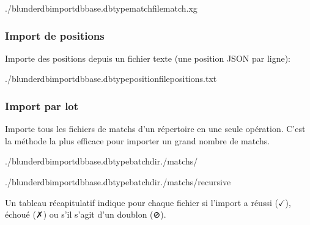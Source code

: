 \documentclass[letterpaper,10pt,french]{sphinxmanual}
\begin{document}
\begin{sphinxVerbatim}[commandchars=\\\{\}]
./blunderdbimport\PYGZhy{}\PYGZhy{}dbbase.db\PYGZhy{}\PYGZhy{}typematch\PYGZhy{}\PYGZhy{}filematch.xg
\end{sphinxVerbatim}


\subsubsection{Import de positions}
\label{\detokenize{cli:import-de-positions}}
\sphinxAtStartPar
Importe des positions depuis un fichier texte (une position JSON par ligne):

\begin{sphinxVerbatim}[commandchars=\\\{\}]
./blunderdbimport\PYGZhy{}\PYGZhy{}dbbase.db\PYGZhy{}\PYGZhy{}typeposition\PYGZhy{}\PYGZhy{}filepositions.txt
\end{sphinxVerbatim}


\subsubsection{Import par lot}
\label{\detokenize{cli:import-par-lot}}
\sphinxAtStartPar
Importe tous les fichiers de matchs d’un répertoire en une seule opération.
C’est la méthode la plus efficace pour importer un grand nombre de matchs.

\begin{sphinxVerbatim}[commandchars=\\\{\}]
./blunderdbimport\PYGZhy{}\PYGZhy{}dbbase.db\PYGZhy{}\PYGZhy{}typebatch\PYGZhy{}\PYGZhy{}dir./matchs/

./blunderdbimport\PYGZhy{}\PYGZhy{}dbbase.db\PYGZhy{}\PYGZhy{}typebatch\PYGZhy{}\PYGZhy{}dir./matchs/\PYGZhy{}\PYGZhy{}recursive
\end{sphinxVerbatim}

\sphinxAtStartPar
Un tableau récapitulatif indique pour chaque fichier si l’import a réussi
(\(\checkmark\)), échoué (✗) ou s’il s’agit d’un doublon (⊘).
\end{document}
